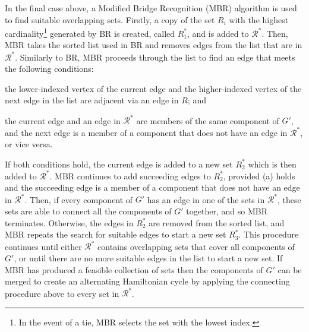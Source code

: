 \documentclass[runningheads]{llncs}
\begin{document}
\noindent  In the final case above, a Modified Bridge Recognition (MBR) algorithm is used to find suitable overlapping sets. Firstly, a copy of the set $R_i$ with the highest cardinality\footnote{In the event of a tie, MBR selects the set with the lowest index.} generated by BR is created, called $R^{*}_1$, and is added to $\mathcal{R}^{*}$. Then, MBR takes the sorted list used in BR and removes edges from the list that are in $\mathcal{R}^{*}$. Similarly to BR, MBR proceeds through the list to find an edge that meets the following conditions:
\begin{enumerate*}[label={(\alph*)}]
	\item the lower-indexed vertex of the current edge and the higher-indexed vertex of the next edge in the list are adjacent via an edge in $R$; and
	\item the current edge and an edge in $\mathcal{R}^{*}$ are members of the same component of $G'$, and the next edge is a member of a component that does not have an edge in $\mathcal{R}^{*}$, or vice versa.
\end{enumerate*}
If both conditions hold, the current edge is added to a new set $R^{*}_2$ which is then added to $\mathcal{R}^{*}$. MBR continues to add succeeding edges to $R^{*}_2$, provided (a) holds and the succeeding edge is a member of a component that does not have an edge in $\mathcal{R}^{*}$. Then, if every component of $G'$ has an edge in one of the sets in $\mathcal{R}^{*}$, these sets are able to connect all the components of $G'$ together, and so MBR terminates. Otherwise, the edges in $R^{*}_2$ are removed from the sorted list, and MBR repeats the search for suitable edges to start a new set $R^{*}_3$. This procedure continues until either $\mathcal{R}^{*}$ contains overlapping sets that cover all components of $G'$, or until there are no more suitable edges in the list to start a new set. If MBR has produced a feasible collection of sets then the components of $G'$ can be merged to create an alternating Hamiltonian cycle by applying the connecting procedure above to every set in $\mathcal{R}^{*}$.
\end{document}
